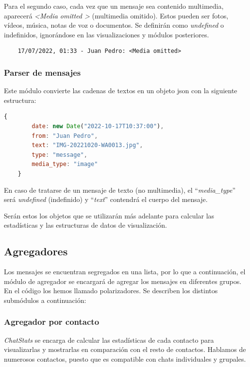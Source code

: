 Para el segundo caso, cada vez que un mensaje sea contenido multimedia, aparecerá \textit{\textless Media omitted \textgreater} (multimedia omitido). Estos pueden ser fotos, vídeos, música, notas de voz o documentos. Se definirán como \textit{undefined} o indefinidos, ignorándose en las visualizaciones y módulos posteriores.

\begin{lstlisting}
	17/07/2022, 01:33 - Juan Pedro: <Media omitted>
\end{lstlisting}

\subsubsection{Parser de mensajes}

Este módulo convierte las cadenas de textos en un objeto \acrshort{json} con la siguiente estructura:

\begin{lstlisting}[language=JavaScript]
	{
		date: new Date("2022-10-17T10:37:00"),
		from: "Juan Pedro",
		text: "IMG-20221020-WA0013.jpg",
		type: "message",
		media_type: "image"
	}
\end{lstlisting}

En caso de tratarse de un mensaje de texto (no multimedia), el ``\textit{media\_type}'' será \textit{undefined} (indefinido) y ``\textit{text}'' contendrá el cuerpo del mensaje.

Serán estos los objetos que se utilizarán más adelante para calcular las estadísticas y las estructuras de datos de visualización.

\subsection{Agregadores}

Los mensajes se encuentran segregados en una lista, por lo que a continuación, el módulo de agregador se encargará de agregar los mensajes en diferentes grupos. En el código los hemos llamado polarizadores. Se describen los distintos submódulos a continuación:

\subsubsection{Agregador por contacto}

\textit{ChatStats} se encarga de calcular las estadísticas de cada contacto para visualizarlas y mostrarlas en comparación con el resto de contactos. Hablamos de numerosos contactos, puesto que es compatible con chats individuales y grupales.

